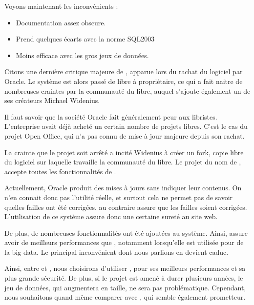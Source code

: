 Voyons maintenant les inconvénients :

\begin{itemize}
\item Documentation assez obscure. 
\item Prend quelques écarts avec la norme SQL2003
\item Moins efficace avec les gros jeux de données. 
\end{itemize} 

Citons une dernière critique majeure de \mysql, apparue lors du rachat du logiciel par Oracle. Le système est alors  passé de libre à propriétaire, ce qui  a fait naitre de nombreuses craintes par la communauté du libre, auquel s'ajoute également un de ses créateurs Michael Widenius. 

Il faut savoir que la société Oracle fait généralement peur aux libristes. L'entreprise avait déjà acheté un certain nombre de projets libres. C'est le cas du projet Open Office, qui n'a pas connu de mise à jour majeure depuis son rachat. 

La crainte que le projet soit arrêté a incité Widenius à créer un fork, copie libre du logiciel sur laquelle travaille la communauté du libre. Le projet du nom de \mdb, accepte toutes les fonctionnalités  de \mysql. 

Actuellement, Oracle produit des mises à jours sans indiquer leur contenus. On n'en connait donc pas l'utilité réelle, et surtout cela ne permet pas de savoir quelles failles ont été corrigées. \mdb au contraire assure que les failles soient corrigées. L'utilisation de ce système assure donc une certaine sureté au site web. 

De plus, de nombreuses fonctionnalités ont été ajoutées au système. Ainsi, \mdb assure avoir de meilleurs performances que \mysql, notamment lorsqu'elle est utilisée pour de la big data. Le principal inconvénient dont nous parlions en devient caduc. 

\medbreak

Ainsi, entre \mysql et \mdb, nous choisirons d'utiliser \mdb, pour ses meilleurs performances et sa plus grande sécurité. De plus, si le projet est amené à durer plusieurs années, le jeu de données, qui augmentera en taille, ne sera pas problématique. Cependant, nous souhaitons quand même comparer \mdb avec \psql, qui semble également prometteur. 




